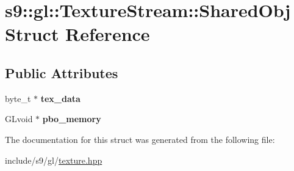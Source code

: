 \hypertarget{structs9_1_1gl_1_1TextureStream_1_1SharedObj}{\section{s9\-:\-:gl\-:\-:\-Texture\-Stream\-:\-:\-Shared\-Obj \-Struct \-Reference}
\label{structs9_1_1gl_1_1TextureStream_1_1SharedObj}
}
\subsection*{\-Public \-Attributes}
\begin{DoxyCompactItemize}
\item 
\hypertarget{structs9_1_1gl_1_1TextureStream_1_1SharedObj_aa9821dd241dc81f893e44313d414d721}{byte\-\_\-t $\ast$ {\bfseries tex\-\_\-data}}\label{structs9_1_1gl_1_1TextureStream_1_1SharedObj_aa9821dd241dc81f893e44313d414d721}

\item 
\hypertarget{structs9_1_1gl_1_1TextureStream_1_1SharedObj_a02e0b37aa3bd21f35c91a3141b5593ae}{\-G\-Lvoid $\ast$ {\bfseries pbo\-\_\-memory}}\label{structs9_1_1gl_1_1TextureStream_1_1SharedObj_a02e0b37aa3bd21f35c91a3141b5593ae}

\end{DoxyCompactItemize}


\-The documentation for this struct was generated from the following file\-:\begin{DoxyCompactItemize}
\item 
include/s9/gl/\hyperlink{texture_8hpp}{texture.\-hpp}\end{DoxyCompactItemize}
